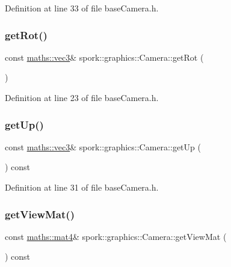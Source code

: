 Definition at line 33 of file base\+Camera.\+h.

\mbox{\label{classspork_1_1graphics_1_1_camera_ae6a19862d6049eb50b742ddbb8365a57}} 
\subsubsection{\texorpdfstring{get\+Rot()}{getRot()}}
{\footnotesize\ttfamily const \hyperlink{structspork_1_1maths_1_1vec3}{maths\+::vec3}\& spork\+::graphics\+::\+Camera\+::get\+Rot (\begin{DoxyParamCaption}{ }\end{DoxyParamCaption})\hspace{0.3cm}{\ttfamily [inline]}}



Definition at line 23 of file base\+Camera.\+h.

\mbox{\label{classspork_1_1graphics_1_1_camera_a6e74066de4f73bcf6e047eef177eb932}} 
\subsubsection{\texorpdfstring{get\+Up()}{getUp()}}
{\footnotesize\ttfamily const \hyperlink{structspork_1_1maths_1_1vec3}{maths\+::vec3}\& spork\+::graphics\+::\+Camera\+::get\+Up (\begin{DoxyParamCaption}{ }\end{DoxyParamCaption}) const\hspace{0.3cm}{\ttfamily [inline]}}



Definition at line 31 of file base\+Camera.\+h.

\mbox{\label{classspork_1_1graphics_1_1_camera_a4f743bbc03938f78c227bcf06c4800e0}} 
\subsubsection{\texorpdfstring{get\+View\+Mat()}{getViewMat()}}
{\footnotesize\ttfamily const \hyperlink{structspork_1_1maths_1_1mat4}{maths\+::mat4}\& spork\+::graphics\+::\+Camera\+::get\+View\+Mat (\begin{DoxyParamCaption}{ }\end{DoxyParamCaption}) const\hspace{0.3cm}{\ttfamily [inline]}}



